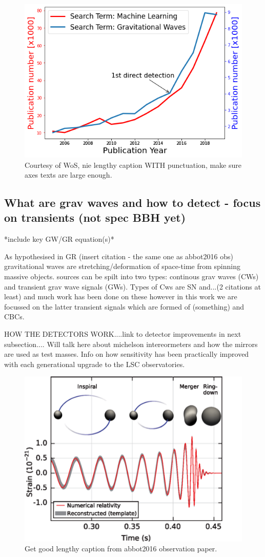 \documentclass[11pt]{article}
\begin{document}
\begin{figure}[t!]
    \centering
    \includegraphics[width=.5\linewidth]{shared_resources/shared_figs/wos.png}
    \caption{Courtesy of WoS, nie lengthy caption WITH punctuation, make sure axes texts are large enough.}
    \label{fig:wos}
\end{figure}

\subsection{What are grav waves and how to detect - focus on transients (not spec BBH yet)}

*include key GW/GR equation(s)*

As hypothesised in GR (insert citation - the same one as abbot2016 obs) gravitational waves are stretching/deformation of space-time from spinning massive objects. sources can be spilt into two types: continous grav waves (CWs) and transient grav wave signals (GWs). Types of Cws are SN and...(2 citations at least) and much work has been done on these however in this work we are focussed on the latter transient signals which are formed of (something) and CBCs.

HOW THE DETECTORS WORK....link to detector improvements in next subsection....
Will talk here about michelson intereormeters and how the mirrors are used as test masses. Info on how sensitivity has been practically improved with each generational upgrade to the LSC observatories.

\begin{figure}[t!]
    \centering
    \includegraphics[width=.5\linewidth]{shared_resources/shared_figs/inspiral.png}
    \caption{Get good lengthy caption from abbot2016 observation paper.~\cite{abbott2016observation}}
    \label{fig:inspiral}
\end{figure}
\end{document}
